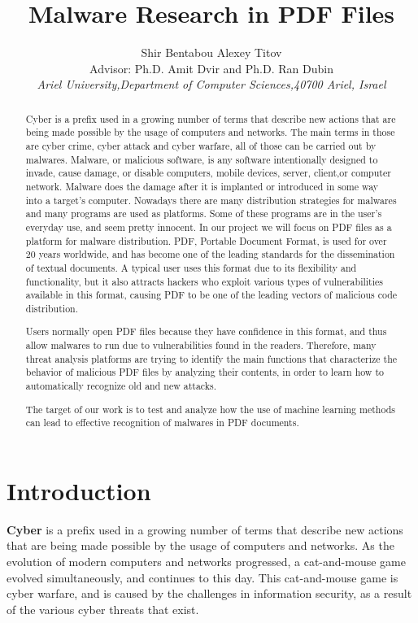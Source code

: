 \documentclass{article}
\title{Malware Research in PDF Files}
\author{Shir Bentabou \qquad Alexey Titov\\
		{\normalsize Advisor: Ph.D. Amit Dvir and Ph.D. Ran Dubin}\\
		{\small{\textit{Ariel University,Department of Computer Sciences,40700 Ariel, Israel}}}}
\date{}
\begin{document}
\renewcommand{\thepage}{\arabic{page}}%
\pagecolor{yellow!20}
\maketitle
\begin{abstract}
		Cyber is a prefix used in a growing number of terms that describe new 
		actions that are being made possible by the usage of computers and networks.
		The main terms in those are cyber crime, cyber attack and cyber warfare, 
		all of those can be carried out by malwares.\newline
		\indent Malware, or malicious software, is any software intentionally designed to invade, 
		cause damage, or disable computers, mobile devices, server, client,or computer 
		network. Malware does the damage after it is implanted or introduced in some way 
		into a target’s computer. Nowadays there are many distribution strategies for malwares 
		and many programs  are used as platforms. Some of these programs are in the user's 
		everyday use, and seem pretty innocent. In our project we will focus on PDF 
		files as a platform for malware distribution.\newline
		\indent PDF, Portable Document Format, is used for over 20 years worldwide, and has become 
		one of the leading standards for the dissemination of textual documents. A typical user uses this format due to its flexibility and functionality,
		but it also attracts hackers who exploit various types of 
		vulnerabilities available in this format, causing PDF to be one of the leading vectors of malicious code 
		distribution. 
		
		
		\indent Users normally open PDF files because they have confidence in this format, and thus allow malwares to run due to vulnerabilities found in the readers.
		Therefore,  many threat analysis platforms are trying to identify the main functions that characterize the behavior of malicious PDF files by analyzing their contents, in order to learn how to automatically recognize old and new attacks.
		
		\indent The target of our work is to test and analyze how the use of machine learning methods  can lead to effective recognition of malwares in PDF documents.
\end{abstract}
\newpage
\section{Introduction}
\indent \textbf{Cyber} is a prefix used in a growing number of terms that describe new actions that are being made possible by the usage of computers and networks. As the evolution of modern computers and networks progressed, a cat-and-mouse game evolved simultaneously, and continues to this day. This cat-and-mouse game is cyber warfare, and is caused by the challenges in information security, as a result of the various cyber threats that exist.
\end{document}
